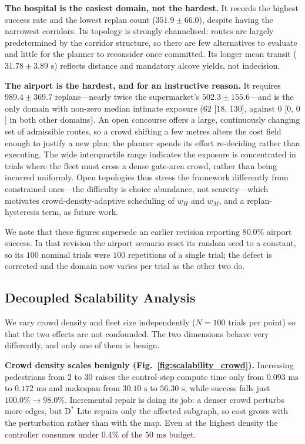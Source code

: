 \documentclass[journal]{IEEEtran}
\begin{document}
\textbf{The hospital is the easiest domain, not the hardest.} It records the highest success rate and the lowest replan count ($351.9 \pm 66.0$), despite having the narrowest corridors. Its topology is strongly channelised: routes are largely predetermined by the corridor structure, so there are few alternatives to evaluate and little for the planner to reconsider once committed. Its longer mean transit ($31.78 \pm 3.89\text{ s}$) reflects distance and mandatory alcove yields, not indecision.

\textbf{The airport is the hardest, and for an instructive reason.} It requires $989.4 \pm 369.7$ replans---nearly twice the supermarket's $502.3 \pm 155.6$---and is the only domain with non-zero median intimate exposure ($62$ [$18$, $130$], against $0$ [$0$, $0$] in both other domains). An open concourse offers a large, continuously changing set of admissible routes, so a crowd shifting a few metres alters the cost field enough to justify a new plan; the planner spends its effort re-deciding rather than executing. The wide interquartile range indicates the exposure is concentrated in trials where the fleet must cross a dense gate-area crowd, rather than being incurred uniformly. Open topologies thus stress the framework differently from constrained ones---the difficulty is choice abundance, not scarcity---which motivates crowd-density-adaptive scheduling of $w_H$ and $w_M$, and a replan-hysteresis term, as future work.

We note that these figures supersede an earlier revision reporting $80.0\%$ airport success. In that revision the airport scenario reset its random seed to a constant, so its $100$ nominal trials were $100$ repetitions of a single trial; the defect is corrected and the domain now varies per trial as the other two do.

\subsection{Decoupled Scalability Analysis}
\label{sec:scalability}
We vary crowd density and fleet size independently ($N=100$ trials per point) so that the two effects are not confounded. The two dimensions behave very differently, and only one of them is benign.





\textbf{Crowd density scales benignly (Fig.~\ref{fig:scalability_crowd}).} Increasing pedestrians from $2$ to $30$ raises the control-step compute time only from $0.093\text{ ms}$ to $0.172\text{ ms}$ and makespan from $30.10\text{ s}$ to $56.30\text{ s}$, while success falls just $100.0\% \to 98.0\%$. Incremental repair is doing its job: a denser crowd perturbs more edges, but $\text{D}^*$ Lite repairs only the affected subgraph, so cost grows with the perturbation rather than with the map. Even at the highest density the controller consumes under $0.4\%$ of the $50\text{ ms}$ budget.
\end{document}
